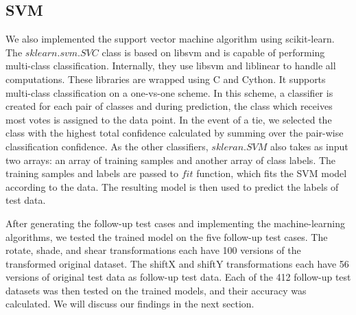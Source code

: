\subsection{SVM}
We also implemented the support vector machine algorithm using scikit-learn. The $sklearn.svm.SVC$ class is based on libsvm and is capable of performing multi-class classification. Internally, they use libsvm and liblinear to handle all computations. These libraries are wrapped using C and Cython. It supports multi-class classification on a one-vs-one scheme. In this scheme, a classifier is created for each pair of classes and during prediction, the class which receives most votes is assigned to the data point. In the event of a tie, we selected the class with the highest total confidence calculated by summing over the pair-wise classification confidence. 
As the other classifiers, $skleran.SVM$ also takes as input two arrays: an array of training samples and another array of class labels. The training samples and labels are passed to $fit$ function, which fits the SVM model according to the data. The resulting model is then used to predict the labels of test data. 


After generating the follow-up test cases and implementing the machine-learning algorithms, we tested the trained model on the five follow-up test cases. The rotate, shade, and shear transformations each have 100 versions of the transformed original dataset. The shiftX and shiftY transformations each have 56 versions of original test data as follow-up test data. Each of the 412 follow-up test datasets was then tested on the trained models, and their accuracy was calculated. We will discuss our findings in the next section.

